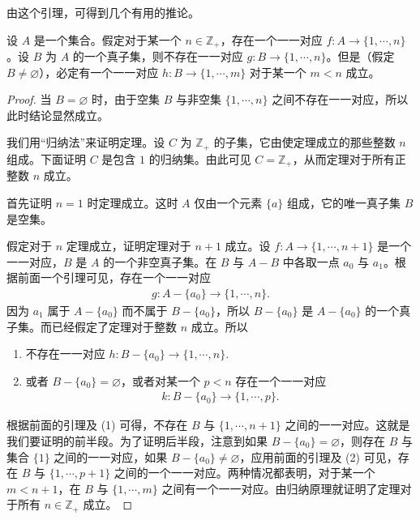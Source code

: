 \documentclass[../../main.tex]{subfiles}
\begin{document}
由这个引理，可得到几个有用的推论。

\begin{theorem}[有限集的真子集]\label{theorem:ch01-有限真子集}
设 $A$ 是一个集合。假定对于某一个 $n \in \mathbb{Z}_{+}$，存在一个一一对应 $f: A \longrightarrow \{1, \cdots, n\}$。设 $B$ 为 $A$ 的一个真子集，则不存在一一对应 $g: B \longrightarrow \{1, \cdots, n\}$。但是（假定 $B \neq \varnothing$），必定有一个一一对应 $h: B \longrightarrow \{1, \cdots, m\}$ 对于某一个 $m < n$ 成立。
\end{theorem}

\begin{proof}
当 $B = \varnothing$ 时，由于空集 $B$ 与非空集 $\{1, \cdots, n\}$ 之间不存在一一对应，所以此时结论显然成立。

我们用“归纳法”来证明定理。设 $C$ 为 $\mathbb{Z}_{+}$ 的子集，它由使定理成立的那些整数 $n$ 组成。下面证明 $C$ 是包含 $1$ 的归纳集。由此可见 $C = \mathbb{Z}_{+}$，从而定理对于所有正整数 $n$ 成立。

首先证明 $n = 1$ 时定理成立。这时 $A$ 仅由一个元素 $\{a\}$ 组成，它的唯一真子集 $B$ 是空集。

假定对于 $n$ 定理成立，证明定理对于 $n+1$ 成立。设 $f: A \longrightarrow \{1, \cdots, n+1\}$ 是一个一一对应，$B$ 是 $A$ 的一个非空真子集。在 $B$ 与 $A - B$ 中各取一点 $a_{0}$ 与 $a_{1}$。根据前面一个引理可见，存在一个一一对应
\begin{align*}
g: A - \{a_{0}\} \longrightarrow \{1, \cdots, n\}.
\end{align*}
因为 $a_{1}$ 属于 $A - \{a_{0}\}$ 而不属于 $B - \{a_{0}\}$，所以 $B - \{a_{0}\}$ 是 $A - \{a_{0}\}$ 的一个真子集。而已经假定了定理对于整数 $n$ 成立。所以
\begin{enumerate}[(1)]
\item 不存在一一对应 $h: B - \{a_{0}\} \longrightarrow \{1, \cdots, n\}$.
\item 或者 $B - \{a_{0}\} = \varnothing$，或者对某一个 $p < n$ 存在一个一一对应
\begin{align*}
k: B - \{a_{0}\} \longrightarrow \{1, \cdots, p\}.
\end{align*}
\end{enumerate}
根据前面的引理及 (1) 可得，不存在 $B$ 与 $\{1, \cdots, n+1\}$ 之间的一一对应。这就是我们要证明的前半段。为了证明后半段，注意到如果 $B - \{a_{0}\} = \varnothing$，则存在 $B$ 与集合 $\{1\}$ 之间的一一对应，如果 $B - \{a_{0}\} \neq \varnothing$，应用前面的引理及 (2) 可见，存在 $B$ 与 $\{1, \cdots, p+1\}$ 之间的一个一一对应。两种情况都表明，对于某一个 $m < n+1$，在 $B$ 与 $\{1, \cdots, m\}$ 之间有一个一一对应。由归纳原理就证明了定理对于所有 $n \in \mathbb{Z}_{+}$ 成立。
\end{proof}
\end{document}
